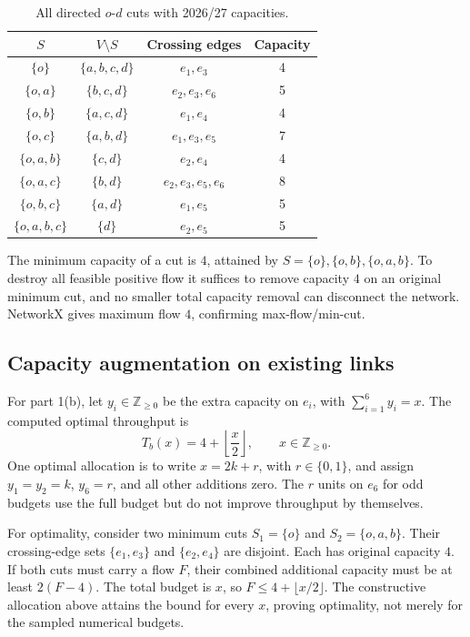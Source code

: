 \documentclass[11pt,a4paper]{article}
\begin{document}
\begin{table}[h]
\centering
\begin{tabular}{c|c|c|c}
\hline
\(S\) & \(V\setminus S\) & Crossing edges & Capacity\\
\hline
\(\{o\}\) & \(\{a,b,c,d\}\) & \(e_1,e_3\) & 4\\
\(\{o,a\}\) & \(\{b,c,d\}\) & \(e_2,e_3,e_6\) & 5\\
\(\{o,b\}\) & \(\{a,c,d\}\) & \(e_1,e_4\) & 4\\
\(\{o,c\}\) & \(\{a,b,d\}\) & \(e_1,e_3,e_5\) & 7\\
\(\{o,a,b\}\) & \(\{c,d\}\) & \(e_2,e_4\) & 4\\
\(\{o,a,c\}\) & \(\{b,d\}\) & \(e_2,e_3,e_5,e_6\) & 8\\
\(\{o,b,c\}\) & \(\{a,d\}\) & \(e_1,e_5\) & 5\\
\(\{o,a,b,c\}\) & \(\{d\}\) & \(e_2,e_5\) & 5\\
\hline
\end{tabular}
\caption{All directed \(o\)-\(d\) cuts with 2026/27 capacities.}
\label{tab:exercise1-cuts}
\end{table}

The minimum capacity of a cut is \(4\), attained by
\(S=\{o\},\{o,b\},\{o,a,b\}\). To destroy all feasible positive flow
it suffices to remove capacity \(4\) on an original minimum cut, and no
smaller total capacity removal can disconnect the network. NetworkX gives
maximum flow \(4\), confirming max-flow/min-cut.

\subsection*{Capacity augmentation on existing links}

For part 1(b), let \(y_i\in\mathbb Z_{\ge 0}\) be the extra capacity on \(e_i\),
with \(\sum_{i=1}^6 y_i=x\). The computed optimal throughput is
\[
T_b(x)=4+\left\lfloor\frac{x}{2}\right\rfloor,
\qquad x\in\mathbb Z_{\ge0}.
\]
One optimal allocation is to write \(x=2k+r\), with \(r\in\{0,1\}\),
and assign \(y_1=y_2=k\), \(y_6=r\), and all other additions zero.
The \(r\) units on \(e_6\) for odd budgets use the full budget but do
not improve throughput by themselves.

For optimality, consider two minimum cuts
\(S_1=\{o\}\) and \(S_2=\{o,a,b\}\). Their crossing-edge sets
\(\{e_1,e_3\}\) and \(\{e_2,e_4\}\) are disjoint. Each has original
capacity \(4\). If both cuts must carry a flow \(F\), their combined
additional capacity must be at least \(2(F-4)\). The total budget is
\(x\), so \(F\le 4+\lfloor x/2\rfloor\). The constructive allocation
above attains the bound for every \(x\), proving optimality, not merely
for the sampled numerical budgets.
\end{document}
